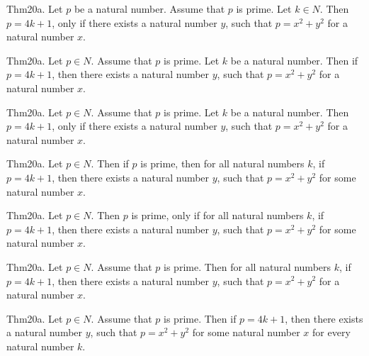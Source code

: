 \documentclass{article}
\begin{document}
Thm20a. Let $p$ be a natural number. Assume that $p$ is prime. Let $k \in N$. Then $p = 4 k + 1$, only if there exists a natural number $y$, such that $p = x ^{ 2}+ y ^{ 2}$ for a natural number $x$.

Thm20a. Let $p \in N$. Assume that $p$ is prime. Let $k$ be a natural number. Then if $p = 4 k + 1$, then there exists a natural number $y$, such that $p = x ^{ 2}+ y ^{ 2}$ for a natural number $x$.

Thm20a. Let $p \in N$. Assume that $p$ is prime. Let $k$ be a natural number. Then $p = 4 k + 1$, only if there exists a natural number $y$, such that $p = x ^{ 2}+ y ^{ 2}$ for a natural number $x$.

Thm20a. Let $p \in N$. Then if $p$ is prime, then for all natural numbers $k$, if $p = 4 k + 1$, then there exists a natural number $y$, such that $p = x ^{ 2}+ y ^{ 2}$ for some natural number $x$.

Thm20a. Let $p \in N$. Then $p$ is prime, only if for all natural numbers $k$, if $p = 4 k + 1$, then there exists a natural number $y$, such that $p = x ^{ 2}+ y ^{ 2}$ for some natural number $x$.

Thm20a. Let $p \in N$. Assume that $p$ is prime. Then for all natural numbers $k$, if $p = 4 k + 1$, then there exists a natural number $y$, such that $p = x ^{ 2}+ y ^{ 2}$ for a natural number $x$.

Thm20a. Let $p \in N$. Assume that $p$ is prime. Then if $p = 4 k + 1$, then there exists a natural number $y$, such that $p = x ^{ 2}+ y ^{ 2}$ for some natural number $x$ for every natural number $k$.
\end{document}
